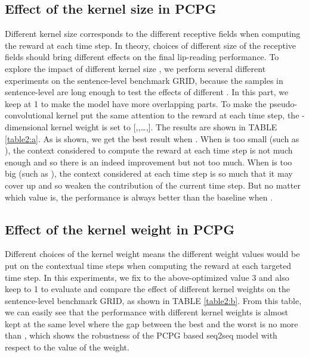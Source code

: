 \documentclass[a4paper, 10pt, conference]{ieeeconf}      \usepackage{FG2020}
\begin{document}
\subsection{Effect of the kernel size  in PCPG} \label{section4.2}
Different kernel size  corresponds to the different receptive fields when computing the reward at each time step. In theory, choices of different size of the receptive fields should bring different effects on the final lip-reading performance. To explore the impact of different kernel size , we perform several different experiments on the sentence-level benchmark GRID, because the samples in sentence-level are long enough to test the effects of different . In this part, we keep  at 1 to make the model have more overlapping parts. To make the pseudo-convolutional kernel put the same attention to the reward at each time step, the -dimensional kernel weight  is set to [,,\dots,]. The results are shown in TABLE \ref{table2:a}. As is shown, we get the best result when . When  is too small (such as ), the context considered to compute the reward at each time step is not much enough and so there is an indeed improvement but not too much. When  is too big (such as ), the context considered at each time step is so much that it may cover up and so weaken the contribution of the current time step. But no matter which value  is, the performance is always better than the baseline  when . 
\vspace{-0.09cm}

\subsection{Effect of the kernel weight  in PCPG}
\vspace{-0.00cm}
Different choices of the kernel weight means the different weight values would be put on the contextual time steps when computing the reward at each targeted time step. In this experiments, we fix  to the above-optimized value 3 and also keep  to 1 to evaluate and compare the effect of different kernel weights  on the sentence-level benchmark GRID, as shown in TABLE \ref{table2:b}. From this table, we can easily see that the performance with different kernel weights is almost kept at the same level where the gap between the best and the worst is no more than , which shows the robustness of the PCPG based seq2seq model with respect to the value of the weight.
\vspace{-0.0cm}
\end{document}
